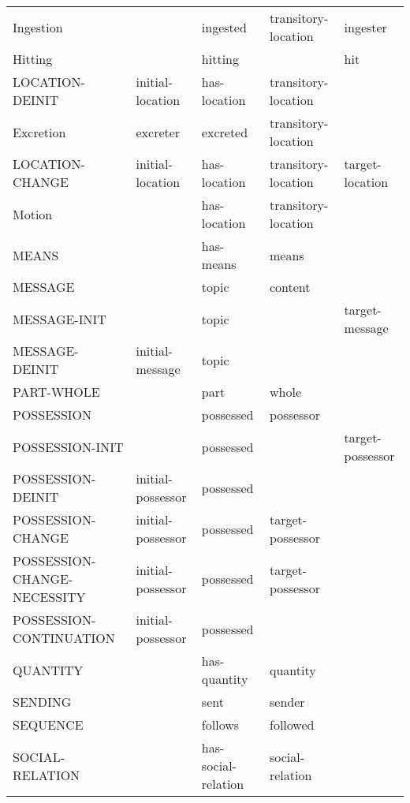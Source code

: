 \documentclass[a4paper]{article}
\newcommand{\fr}[1]{\textsf{#1}}
\newcommand{\rl}[1]{\textsf{#1}}
\begin{document}
\begin{table}
{\begin{tabular}{lllll}
            \fr{Ingestion} & & \rl{ingested} & \rl{transitory-location} & \rl{ingester} \\
            \fr{Hitting} & & \rl{hitting} & & \rl{hit} \\
            \fr{LOCATION-DEINIT} & \rl{initial-location} & \rl{has-location} & \rl{transitory-location} & \\
            \fr{Excretion} & \rl{excreter} & \rl{excreted} & \rl{transitory-location} & \\
            \fr{LOCATION-CHANGE} & \rl{initial-location} & \rl{has-location} & \rl{transitory-location} & \rl{target-location} \\
            \fr{Motion} & & \rl{has-location} & \rl{transitory-location} & \\
            \fr{MEANS} & & \rl{has-means} & \rl{means} & \\
            \fr{MESSAGE} & & \rl{topic} & \rl{content} & \\
            \fr{MESSAGE-INIT} & & \rl{topic} & & \rl{target-message} \\
            \fr{MESSAGE-DEINIT} & \rl{initial-message} & \rl{topic} & & \\
            \fr{PART-WHOLE} & & \rl{part} & \rl{whole} & \\
            \fr{POSSESSION} & & \rl{possessed} & \rl{possessor} & \\
            \fr{POSSESSION-INIT} & & \rl{possessed} & & \rl{target-possessor} \\
            \fr{POSSESSION-DEINIT} & \rl{initial-possessor} & \rl{possessed} & & \\
            \fr{POSSESSION-CHANGE} & \rl{initial-possessor} & \rl{possessed} & \rl{target-possessor} & \\
            \fr{POSSESSION-CHANGE-NECESSITY} & \rl{initial-possessor} & \rl{possessed} & \rl{target-possessor} & \\
            \fr{POSSESSION-CONTINUATION} & \rl{initial-possessor} & \rl{possessed} & & \\
            \fr{QUANTITY} & & \rl{has-quantity} & \rl{quantity} & \\
            \fr{SENDING} & & \rl{sent} & \rl{sender} & \\
            \fr{SEQUENCE} & & \rl{follows} & \rl{followed} & \\
            \fr{SOCIAL-RELATION} & & \rl{has-social-relation} & \rl{social-relation} & \\

\end{tabular}}
\end{table}
\end{document}
